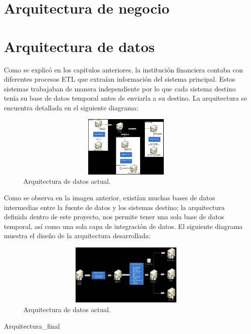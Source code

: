 \documentclass[a4paper,openright,12pt]{book}
\begin{document}
\section{Arquitectura de negocio}
\section{Arquitectura de datos}
Como se explic\'o en los capitulos anteriores, la instituci\'on financiera contaba con diferentes procesos ETL que extra\'ian informaci\'on del sistema principal. Estos sistemas trabajaban de manera independiente por lo que cada sistema destino ten\'ia su base de datos temporal antes de enviarla a su destino. La arquitectura se encuentra detallada en el siguiente diagrama:

\begin{figure}[htb]
  \begin{center}
    \includegraphics[width=12cm, height=3cm, scale=0.5]{Arquitecturadatos_actual.jpg}
        \caption{Arquitectura de datos actual.}
    \label{fig:arquitecturaactual}
  \end{center}
\end{figure}

Como se observa en la imagen anterior, exist\'ian muchas bases de datos intermedias entre la fuente de datos y los sistemas destino; la arquitectura definida dentro de este proyecto, nos permite tener una sola base de datos temporal, as\'i como una sola capa de integraci\'on de datos. El siguiente diagrama muestra el dise\~no de la arquitectura desarrollada: 

\begin{figure}[htb]
  \begin{center}
    \includegraphics[width=12cm, height=3cm, scale=0.5]{Arquitectura_final.jpg}
        \caption{Arquitectura de datos actual.}
    \label{fig:Arquitecturafinal}
  \end{center}
\end{figure}
Arquitectura_final
\end{document}
